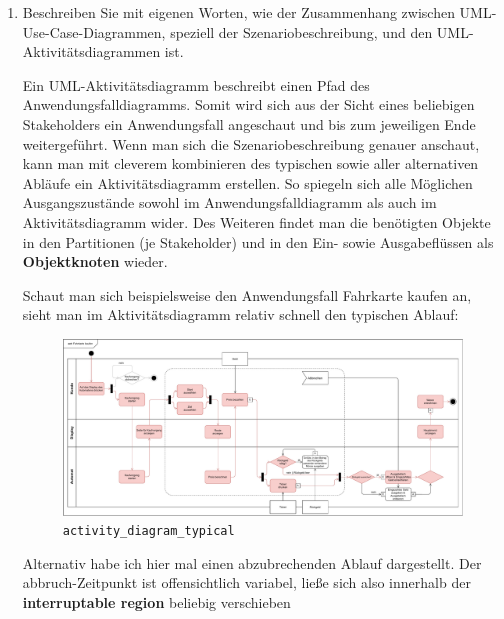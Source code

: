 \documentclass{article}
\newcommand{\gqq}[1]{\glqq{}#1\grqq{}}
\begin{document}
\begin{enumerate}[label=\alph*.]
        \newpage
        \item Beschreiben Sie mit eigenen Worten, wie der Zusammenhang zwischen UML-Use-Case-Diagrammen, speziell der Szenariobeschreibung, und den UML-Aktivitätsdiagrammen ist.

            \begin{displayquote}
                Ein UML-Aktivitätsdiagramm beschreibt einen Pfad des Anwendungsfalldiagramms.
                Somit wird sich aus der Sicht eines beliebigen Stakeholders ein Anwendungsfall angeschaut und bis zum jeweiligen Ende weitergeführt.
                Wenn man sich die Szenariobeschreibung genauer anschaut, kann man mit cleverem kombinieren des typischen sowie aller alternativen Abläufe ein Aktivitätsdiagramm erstellen.
                So spiegeln sich alle Möglichen Ausgangszustände sowohl im Anwendungsfalldiagramm als auch im Aktivitätsdiagramm wider.
                Des Weiteren findet man die benötigten Objekte in den Partitionen (je Stakeholder) und in den Ein- sowie Ausgabeflüssen als \textbf{Objektknoten} wieder.

                \vspace{1em}
                Schaut man sich beispielsweise den Anwendungsfall \gqq{Fahrkarte kaufen} an, sieht man im Aktivitätsdiagramm relativ schnell den typischen Ablauf:
                
                \begin{figure}[ht]
                    \includegraphics[width=\textwidth]{swt_wende_tim_h04_activity_diagram_typical.pdf}
                    \caption{\texttt{activity\_diagram\_typical}}
                \end{figure}

                Alternativ habe ich hier mal einen abzubrechenden Ablauf dargestellt.
                Der abbruch-Zeitpunkt ist offensichtlich variabel, ließe sich also innerhalb der \textbf{interruptable region} beliebig verschieben


\end{displayquote}
\end{enumerate}
\end{document}
